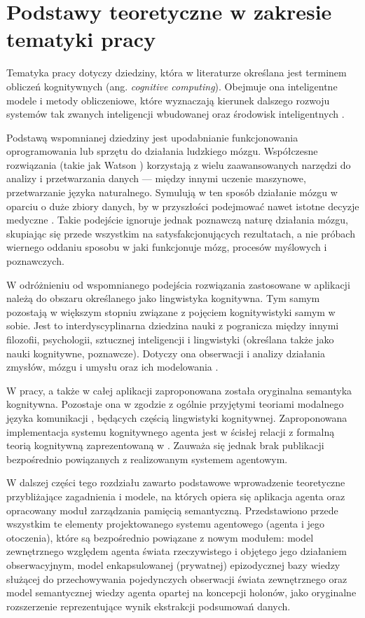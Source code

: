 
\chapter{Podstawy teoretyczne w zakresie tematyki pracy}

Tematyka pracy dotyczy dziedziny, która w literaturze określana jest terminem obliczeń kognitywnych (ang. \textit{cognitive computing}). Obejmuje ona inteligentne modele i metody obliczeniowe, które wyznaczają kierunek dalszego rozwoju systemów tak zwanych inteligencji wbudowanej oraz środowisk inteligentnych \cite{hur15}.

Podstawą wspomnianej dziedziny jest upodabnianie funkcjonowania oprogramowania lub sprzętu do działania ludzkiego mózgu. Współczesne rozwiązania (takie jak  Watson \cite{kel13}) korzystają z wielu zaawansowanych narzędzi do analizy i przetwarzania danych --- między innymi uczenie maszynowe, przetwarzanie języka naturalnego. Symulują w ten sposób działanie mózgu w oparciu o duże zbiory danych, by w przyszłości podejmować nawet istotne decyzje medyczne \cite{woo15}. Takie podejście ignoruje jednak poznawczą naturę działania mózgu, skupiając się przede wszystkim na satysfakcjonujących rezultatach, a nie próbach wiernego oddaniu sposobu w jaki funkcjonuje mózg, procesów myślowych i poznawczych.

W odróżnieniu od wspomnianego podejścia rozwiązania zastosowane w aplikacji należą do obszaru określanego jako lingwistyka kognitywna. Tym samym pozostają w większym stopniu związane z pojęciem kognitywistyki samym w sobie. Jest to interdyscyplinarna dziedzina nauki z pogranicza między innymi filozofii, psychologii, sztucznej inteligencji i lingwistyki (określana także jako nauki kognitywne, poznawcze). Dotyczy ona obserwacji i analizy działania zmysłów, mózgu i umysłu oraz ich modelowania \cite{tha17}.

W pracy, a także w całej aplikacji zaproponowana została oryginalna semantyka kognitywna. Pozostaje ona w zgodzie z ogólnie przyjętymi teoriami modalnego języka komunikacji \cite{tal00}, będących częścią lingwistyki kognitywnej. Zaproponowana implementacja systemu kognitywnego agenta jest w ścisłej relacji z formalną teorią kognitywną zaprezentowaną w \cite{kat07}. Zauważa się jednak brak publikacji bezpośrednio powiązanych z realizowanym systemem agentowym.

W dalszej części tego rozdziału zawarto podstawowe wprowadzenie teoretyczne przybliżające zagadnienia i modele, na których opiera się aplikacja agenta oraz opracowany moduł zarządzania pamięcią semantyczną. Przedstawiono przede wszystkim te elementy projektowanego systemu agentowego (agenta i jego otoczenia), które są bezpośrednio powiązane z nowym modułem: model zewnętrznego względem agenta świata rzeczywistego i objętego jego działaniem obserwacyjnym, model enkapsulowanej (prywatnej) epizodycznej bazy wiedzy służącej do przechowywania pojedynczych obserwacji świata zewnętrznego oraz model semantycznej wiedzy agenta opartej na koncepcji holonów, jako oryginalne rozszerzenie reprezentujące wynik ekstrakcji podsumowań danych.

